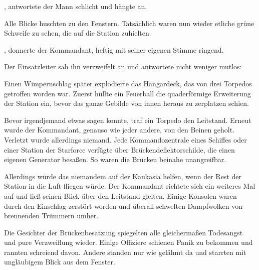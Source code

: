 \par

, antwortete der Mann schlicht und hängte an. 

\par

Alle Blicke huschten zu den Fenstern. Tatsächlich waren nun wieder etliche grüne Schweife zu sehen, die auf die Station zuhielten.

\par

, donnerte der Kommandant, heftig mit seiner eigenen Stimme ringend.

\par

Der Einsatzleiter sah ihn verzweifelt an und antwortete nicht weniger mutlos: 

\par

Einen Wimpernschlag später explodierte das Hangardeck, das von drei Torpedos getroffen worden war. Zuerst hüllte ein Feuerball die quaderförmige Erweiterung der Station ein, bevor das ganze Gebilde von innen heraus zu zerplatzen schien.

\par

Bevor irgendjemand etwas sagen konnte, traf ein Torpedo den Leitstand. Erneut wurde der Kommandant, genauso wie jeder andere, von den Beinen geholt. Verletzt wurde allerdings niemand. Jede Kommandozentrale eines Schiffes oder einer Station der Starforce verfügte über Brückendeflektorschilde, die einen eigenen Generator besaßen. So waren die Brücken beinahe unangreifbar.

\par

Allerdings würde das niemandem auf der Kaukasia helfen, wenn der Rest der Station in die Luft fliegen würde. Der Kommandant richtete sich ein weiteres Mal auf und ließ seinen Blick über den Leitstand gleiten. Einige Konsolen waren durch den Einschlag zerstört worden und überall schwelten Dampfwolken von brennenden Trümmern umher.

\par

Die Gesichter der Brückenbesatzung spiegelten alle gleichermaßen Todesangst und pure Verzweiflung wieder. Einige Offiziere schienen Panik zu bekommen und rannten schreiend davon. Andere standen nur wie gelähmt da und starrten mit ungläubigem Blick aus dem Fenster.
